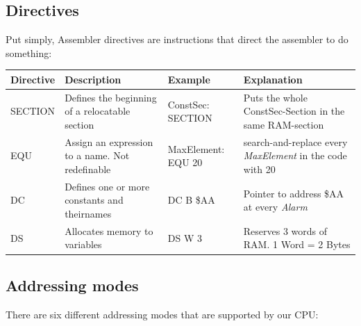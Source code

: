 \documentclass[a4paper, 11pt, nofootinbib]{article}
\renewcommand*{\thead}[1]{\bfseries #1}
\begin{document}
\subsection{Directives}
Put simply, Assembler directives are instructions that direct the assembler to do something:
\begin{center}
\begin{tabular}{|p{2cm}|p{5cm}|p{4cm}|p{5cm}|}
	\hline
	\thead{Directive} & \thead{Description} & \thead{Example} & \thead{Explanation} \\
	\hline
	SECTION & Defines the beginning of a relocatable section & ConstSec: SECTION & Puts the whole ConstSec-Section in the same RAM-section\\
	\hline
	EQU & Assign an expression to a name. Not redefinable & MaxElement: EQU 20 & search-and-replace every \textit{MaxElement} in the code with 20\\
	\hline
	DC & Defines one or more constants and theirnames & DC B \$AA & Pointer to address \$AA at every \textit{Alarm}\\
	\hline
	DS & Allocates memory to variables & DS W 3 & Reserves 3 words of RAM. 1 Word = 2 Bytes\\
	\hline
\end{tabular}
\end{center}

\newpage

\subsection{Addressing modes}
There are six different addressing modes that are supported by our CPU:
\end{document}
